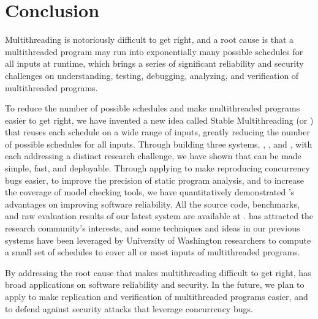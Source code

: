 \chapter{Conclusion} \label{sec:conclusion}

Multithreading is notoriously difficult to get right, and a root cause is that a 
multithreaded program may run into exponentially many
possible schedules for all inputs at runtime, which brings a series of
significant reliability and security challenges on understanding,
testing, debugging, analyzing, and verification of multithreaded
programs.

To reduce the number of possible schedules and make multithreaded
programs easier to get right, we have invented a new idea called Stable
Multithreading (or \smt) that reuses each schedule on a wide range of inputs,
greatly reducing the number of possible schedules for all inputs. Through
building three \smt systems, \tern, \peregrine, and \parrot, with each 
addressing
a distinct research challenge, we have shown that \smt can be made simple, fast,
and deployable. Through applying \smt to make reproducing concurrency bugs
easier, to improve the precision of static program analysis, and to increase the
coverage of model checking tools, we have quantitatively demonstrated \smt's 
advantages on improving software reliability. All the source code,
benchmarks, and raw evaluation results of our latest \smt system \parrot are
available at \github. \smt has attracted the research community's interests, 
and some techniques and ideas in our previous systems have been leveraged by 
University of Washington researchers to compute a small set of schedules to 
cover all or most inputs of multithreaded programs.

By addressing the root cause that makes multithreading difficult to get right,
\smt has broad applications on software reliability and security. In the 
future, we plan to apply \smt to make replication and verification of 
multithreaded programs easier, and to defend against security attacks 
that leverage concurrency bugs.